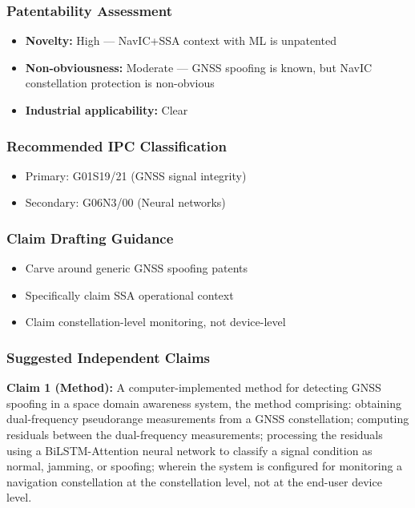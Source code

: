 \documentclass[11pt,a4paper]{article}
\begin{document}
\subsubsection*{Patentability Assessment}
\begin{itemize}
\item \textbf{Novelty:} High — NavIC+SSA context with ML is unpatented
\item \textbf{Non-obviousness:} Moderate — GNSS spoofing is known, but NavIC constellation protection is non-obvious
\item \textbf{Industrial applicability:} Clear
\end{itemize}

\subsubsection*{Recommended IPC Classification}
\begin{itemize}
\item Primary: G01S19/21 (GNSS signal integrity)
\item Secondary: G06N3/00 (Neural networks)
\end{itemize}

\subsubsection*{Claim Drafting Guidance}
\begin{itemize}
\item Carve around generic GNSS spoofing patents
\item Specifically claim SSA operational context
\item Claim constellation-level monitoring, not device-level
\end{itemize}

\subsubsection*{Suggested Independent Claims}

\textbf{Claim 1 (Method):} A computer-implemented method for detecting GNSS spoofing in a space domain awareness system, the method comprising: obtaining dual-frequency pseudorange measurements from a GNSS constellation; computing residuals between the dual-frequency measurements; processing the residuals using a BiLSTM-Attention neural network to classify a signal condition as normal, jamming, or spoofing; wherein the system is configured for monitoring a navigation constellation at the constellation level, not at the end-user device level.
\end{document}

